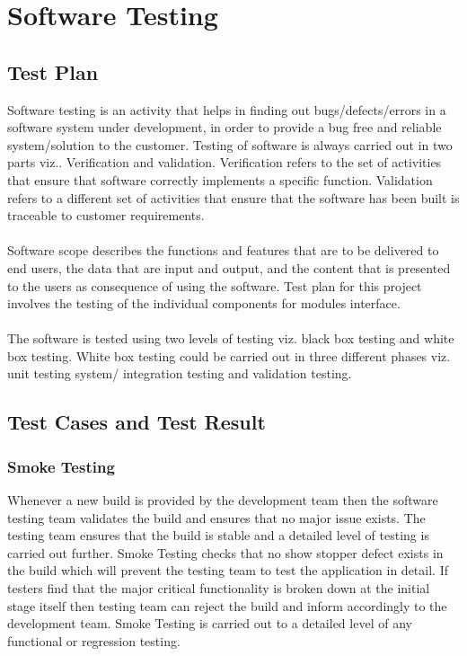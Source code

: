\documentclass[oneside, 12pt]{book}
\begin{document}
\section{Software Testing}
\newpage
\subsection{Test Plan}
Software testing is an activity that helps in finding out bugs/defects/errors in a software system under development, in order to provide a bug free and reliable system/solution to the customer. Testing of software is always carried out in two parts viz.. Verification and validation. Verification refers to the set of activities that ensure that software correctly implements a specific function. Validation refers to a different set of activities that ensure that the software has been built is traceable to customer requirements.
\\\\Software scope describes the functions and features that are to be delivered to end users, the data that are input and output, and the content that is presented to the users as consequence of using the software. Test plan for this project involves the testing of the individual components for modules interface.
\\\\The software is tested using two levels of testing viz. black box testing and white box testing. White box testing could be carried out in three different phases viz. unit testing system/ integration testing and validation testing.
\subsection{Test Cases and Test Result}
\subsubsection{Smoke Testing}
Whenever a new build is provided by the development team then the software testing team validates the build and ensures that no major issue exists. The testing team ensures that the build is stable and a detailed level of testing is carried out further. Smoke Testing checks that no show stopper defect exists in the build which will prevent the testing team to test the application in detail. If testers find that the major critical functionality is broken down at the initial stage itself then testing team can reject the build and inform accordingly to the development team. Smoke Testing is carried out to a detailed level of any functional or regression testing.
\end{document}
